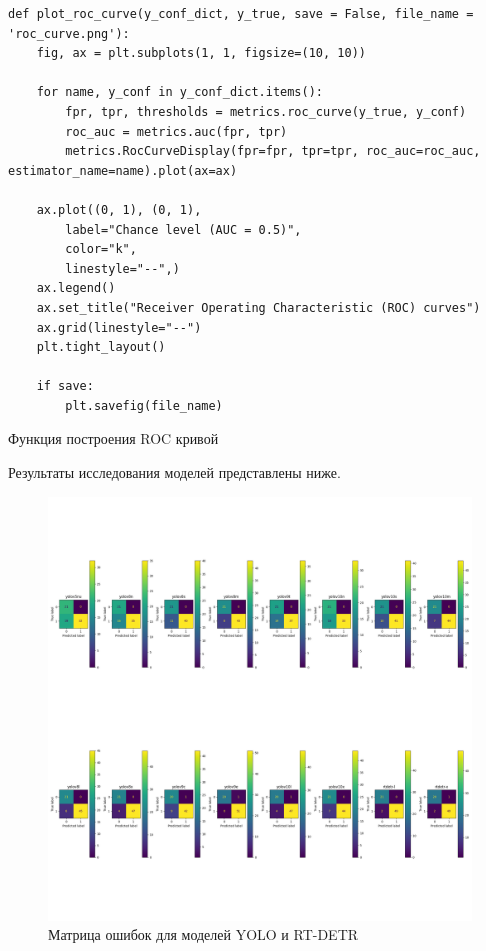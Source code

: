 \documentclass[../document.tex]{subfiles}
\begin{document}
 		\begin{listing}[H]
 		\begin{verbatim}
def plot_roc_curve(y_conf_dict, y_true, save = False, file_name = 'roc_curve.png'):
	fig, ax = plt.subplots(1, 1, figsize=(10, 10))
	
	for name, y_conf in y_conf_dict.items():
		fpr, tpr, thresholds = metrics.roc_curve(y_true, y_conf)
		roc_auc = metrics.auc(fpr, tpr)
		metrics.RocCurveDisplay(fpr=fpr, tpr=tpr, roc_auc=roc_auc, estimator_name=name).plot(ax=ax)
	
	ax.plot((0, 1), (0, 1), 
		label="Chance level (AUC = 0.5)",
		color="k",
		linestyle="--",)
	ax.legend()
	ax.set_title("Receiver Operating Characteristic (ROC) curves")
	ax.grid(linestyle="--")
	plt.tight_layout()
	
	if save:
		plt.savefig(file_name)
 		\end{verbatim}
 		\caption{\label{sample3}Функция построения ROC кривой}
 		\end{listing}
 		\par Результаты исследования моделей представлены ниже.
 		\begin{figure}[H]
 			\centering
 			\includegraphics[scale=0.35]{ConfMat_plot.png}
 			\caption{Матрица ошибок для моделей YOLO и RT-DETR}
 		\end{figure}
\end{document}
